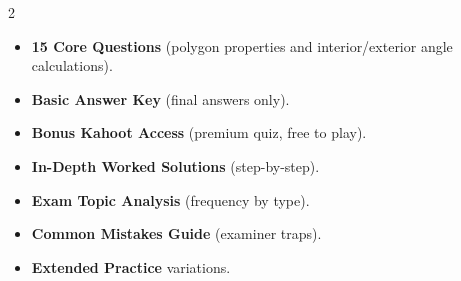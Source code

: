 \documentclass[11pt,a4paper]{article}
\newcommand{\FullReleaseDate}{April 30, 2026}
\begin{document}
\vspace{8pt}

\begin{multicols}{2}
  \begin{tcolorbox}[card, title=\sffamily\bfseries\textcolor{white}{\faHandPointDown\ TODAY (Simplified Version)}, colbacktitle=mainblue, boxed title style={sharp corners, boxrule=0pt}]
    \begin{itemize}[leftmargin=1.2em, itemsep=2pt]
      \item \small \textbf{15 Core Questions} (polygon properties and interior/exterior angle calculations).
      \item \small \textbf{Basic Answer Key} (final answers only).
      \item \small \textbf{Bonus Kahoot Access} (premium quiz, free to play).
    \end{itemize}
  \end{tcolorbox}

  \columnbreak

  \begin{tcolorbox}[card, title=\sffamily\bfseries\textcolor{white}{\faRocket\ ON \FullReleaseDate\ (Full Upgrade)}, colbacktitle=mainblue, boxed title style={sharp corners, boxrule=0pt}]
    \begin{itemize}[leftmargin=1.2em, itemsep=2pt]
      \item \small \textbf{In-Depth Worked Solutions} (step-by-step).
      \item \small \textbf{Exam Topic Analysis} (frequency by type).
      \item \small \textbf{Common Mistakes Guide} (examiner traps).
      \item \small \textbf{Extended Practice} variations.
    \end{itemize}
  \end{tcolorbox}
\end{multicols}
\end{document}
